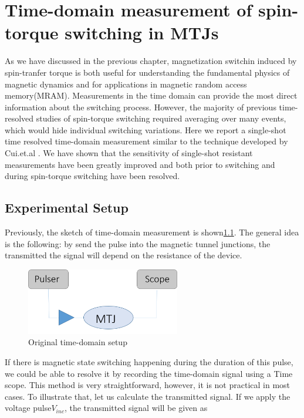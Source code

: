 \chapter{Time-domain measurement of spin-torque switching in MTJs}

As we have discussed in the previous chapter, magnetization switchin induced by spin-tranfer torque is both useful for understanding the fundamental physics of magnetic dynamics and for applications in magnetic random access memory(MRAM). Measurements in the time domain can provide the most direct information about the switching process. However, the majority of previous time-resolved studies of spin-torque switching required averaging over many events, which would hide individual switching variations. Here we report a single-shot time resolved time-domain measurement similar to the technique developed by Cui.et.al \cite{Cui}. We have shown that the sensitivity of single-shot resistant measurements have been greatly improved and both prior to switching and during spin-torque switching have been resolved. 

\section{Experimental Setup}
Previously, the sketch of time-domain measurement is shown\ref{fig:time_set}. The general idea is the following: by send the pulse into the magnetic tunnel junctions, the transmitted the signal will depend on the resistance of the device. 

\begin{figure}[h]
  \centering
  \includegraphics[width=0.6\textwidth]{fig/time_set.png}
  \caption{Original time-domain setup}
  \label{fig:time_set}
\end{figure}

If there is magnetic state switching happening during the duration of this pulse, we could be able to resolve it by recording the time-domain signal using a Time scope. This method is very straightforward, however, it is not practical in most cases. To illustrate that, let us calculate the transmitted signal.
 If we apply the voltage pulse$V_{inc}$, the transmitted signal will be given as

